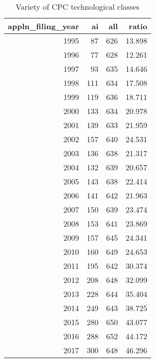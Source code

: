 \begin{table}[ht]
\centering
\begin{tabular}{rrrr}
  \hline
appln\_filing\_year & ai & all & ratio \\ 
  \hline
1995 &   87 &  626 & 13.898 \\ 
  1996 &   77 &  628 & 12.261 \\ 
  1997 &   93 &  635 & 14.646 \\ 
  1998 &  111 &  634 & 17.508 \\ 
  1999 &  119 &  636 & 18.711 \\ 
  2000 &  133 &  634 & 20.978 \\ 
  2001 &  139 &  633 & 21.959 \\ 
  2002 &  157 &  640 & 24.531 \\ 
  2003 &  136 &  638 & 21.317 \\ 
  2004 &  132 &  639 & 20.657 \\ 
  2005 &  143 &  638 & 22.414 \\ 
  2006 &  141 &  642 & 21.963 \\ 
  2007 &  150 &  639 & 23.474 \\ 
  2008 &  153 &  641 & 23.869 \\ 
  2009 &  157 &  645 & 24.341 \\ 
  2010 &  160 &  649 & 24.653 \\ 
  2011 &  195 &  642 & 30.374 \\ 
  2012 &  208 &  648 & 32.099 \\ 
  2013 &  228 &  644 & 35.404 \\ 
  2014 &  249 &  643 & 38.725 \\ 
  2015 &  280 &  650 & 43.077 \\ 
  2016 &  288 &  652 & 44.172 \\ 
  2017 &  300 &  648 & 46.296 \\ 
   \hline
\end{tabular}
\caption{Variety of CPC technological classes} 
\end{table}
